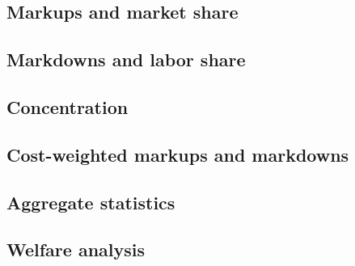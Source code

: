 \documentclass[12pt]{article}%
\begin{document}
\subsection{Markups and market share}

\subsection{Markdowns and labor share}


\subsection{Concentration}





\subsection{Cost-weighted markups and markdowns}


\subsection{Aggregate statistics}

\subsection{Welfare analysis}



\newpage

\end{document}
